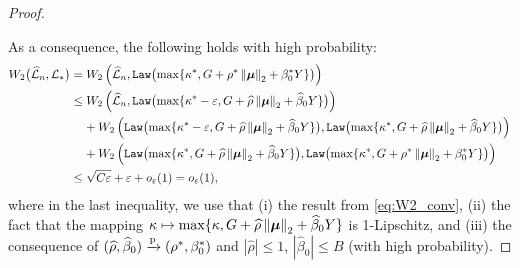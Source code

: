 \begin{proof}
\begin{itemize}
\end{itemize}    
As a consequence, 
the following holds with high probability:
    \begin{align*}
            W_2\bigl( \widehat {\mathcal{L}}_{n}, \mathcal{L}_* \bigr)
            & = W_2 \left( 
                \widehat {\mathcal{L}}_{n},
                \mathtt{Law}\bigl( \max\{ \kappa^*, G + \rho^*\left\|{{\boldsymbol{\mu}}}\right\|_2 + \beta_0^* Y \} \bigr)
             \right) \\
            & \le
            W_2\left( \widehat {\mathcal{L}}_{n}, \mathtt{Law} \bigl(\max\{ \kappa^* - \varepsilon, G + \widehat\rho \left\|{{\boldsymbol{\mu}}}\right\|_2 + \widehat\beta_0 Y \} \bigr) \right) \\
            & \phantom{\le} \  + W_2\left( \mathtt{Law} \bigl(\max\{ \kappa^* - \varepsilon, G + \widehat\rho \left\|{{\boldsymbol{\mu}}}\right\|_2 + \widehat\beta_0 Y \} \bigr),
            \mathtt{Law} \bigl(\max\{ \kappa^* , G + \widehat\rho \left\|{{\boldsymbol{\mu}}}\right\|_2 + \widehat\beta_0 Y \} \bigr) \right)
            \\
            & \phantom{\le} \  + W_2\left( \mathtt{Law} \bigl(\max\{ \kappa^* , G + \widehat\rho \left\|{{\boldsymbol{\mu}}}\right\|_2 + \widehat\beta_0 Y 
            \} \bigr) 
            ,
            \mathtt{Law}\bigl( \max\{ \kappa^*, G + \rho^*\left\|{{\boldsymbol{\mu}}}\right\|_2 + \beta_0^* Y \} \bigr)
            \right) \\
            & \le \sqrt{C \varepsilon} + \varepsilon + o_\varepsilon(1)
            = o_\varepsilon(1),
    \end{align*}
    where in the last inequality, we use that (i) the result from \cref{eq:W2_conv}, (ii) the fact that the mapping $\kappa \mapsto \max\{ \kappa, G + \widehat\rho \left\|{{\boldsymbol{\mu}}}\right\|_2 + \widehat\beta_0 Y \}$ is 1-Lipschitz, and (iii) the consequence of $(\widehat\rho, \widehat\beta_0) \xrightarrow{\mathrm{p}} (\rho^*, \beta_0^*)$ and $|\hat\rho| \le 1$, $|\hat\beta_0| \le B$ (with high probability). 
    

\end{proof}
